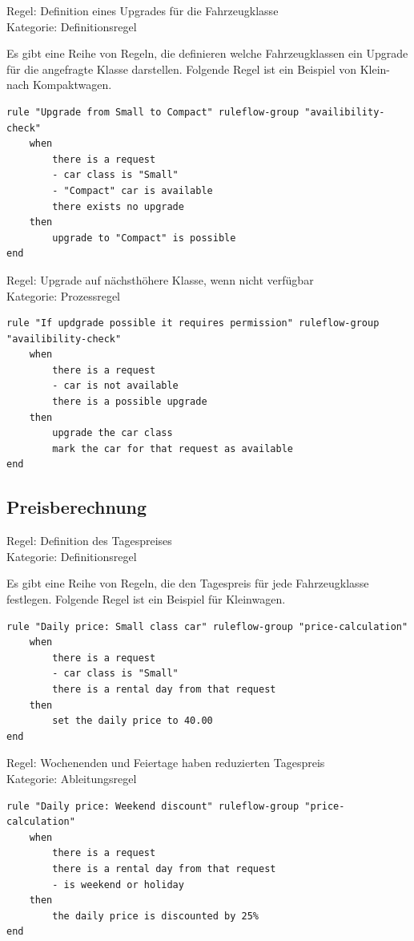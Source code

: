 Regel: Definition eines Upgrades für die Fahrzeugklasse \\
Kategorie: Definitionsregel

Es gibt eine Reihe von Regeln, die definieren welche Fahrzeugklassen ein Upgrade
für die angefragte Klasse darstellen. Folgende Regel ist ein Beispiel von
Klein- nach Kompaktwagen.

\begin{lstlisting}
rule "Upgrade from Small to Compact" ruleflow-group "availibility-check"
	when
		there is a request
		- car class is "Small"
		- "Compact" car is available
		there exists no upgrade
	then
		upgrade to "Compact" is possible	
end
\end{lstlisting}

Regel: Upgrade auf nächsthöhere Klasse, wenn nicht verfügbar \\
Kategorie: Prozessregel

\begin{lstlisting}
rule "If updgrade possible it requires permission" ruleflow-group "availibility-check"
	when
		there is a request
		- car is not available
		there is a possible upgrade
	then
		upgrade the car class
		mark the car for that request as available
end
\end{lstlisting}

\subsection{Preisberechnung}

Regel: Definition des Tagespreises \\
Kategorie: Definitionsregel

Es gibt eine Reihe von Regeln, die den Tagespreis für jede Fahrzeugklasse festlegen.
Folgende Regel ist ein Beispiel für Kleinwagen.

\begin{lstlisting}
rule "Daily price: Small class car" ruleflow-group "price-calculation"
	when
		there is a request
		- car class is "Small"
		there is a rental day from that request
	then
		set the daily price to 40.00
end
\end{lstlisting}

Regel: Wochenenden und Feiertage haben reduzierten Tagespreis \\
Kategorie: Ableitungsregel

\begin{lstlisting}
rule "Daily price: Weekend discount" ruleflow-group "price-calculation"
	when
		there is a request
		there is a rental day from that request
		- is weekend or holiday
	then
		the daily price is discounted by 25%
end
\end{lstlisting}

